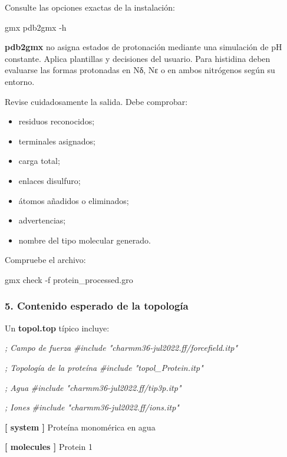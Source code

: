 \documentclass[
  spanish,
  11pt,
  a4paper]{article}
\newenvironment{Shaded}{\begin{snugshade}}{\end{snugshade}}
\newcommand{\AttributeTok}[1]{\textcolor[rgb]{0.13,0.29,0.53}{#1}}
\newcommand{\CommentTok}[1]{\textcolor[rgb]{0.56,0.35,0.01}{\textit{#1}}}
\newcommand{\DataTypeTok}[1]{\textcolor[rgb]{0.13,0.29,0.53}{#1}}
\newcommand{\ExtensionTok}[1]{#1}
\newcommand{\KeywordTok}[1]{\textcolor[rgb]{0.13,0.29,0.53}{\textbf{#1}}}
\newcommand{\NormalTok}[1]{#1}
\providecommand{\tightlist}{%
  \setlength{\itemsep}{0pt}\setlength{\parskip}{0pt}}
\begin{document}
Consulte las opciones exactas de la instalación:

\begin{Shaded}
\begin{Highlighting}[]
\ExtensionTok{gmx}\NormalTok{ pdb2gmx }\AttributeTok{{-}h}
\end{Highlighting}
\end{Shaded}

\textbf{pdb2gmx} no asigna estados de protonación mediante una
simulación de pH constante. Aplica plantillas y decisiones del usuario.
Para histidina deben evaluarse las formas protonadas en Nδ, Nε o en
ambos nitrógenos según su entorno.

Revise cuidadosamente la salida. Debe comprobar:

\begin{itemize}
\tightlist
\item
  residuos reconocidos;
\item
  terminales asignados;
\item
  carga total;
\item
  enlaces disulfuro;
\item
  átomos añadidos o eliminados;
\item
  advertencias;
\item
  nombre del tipo molecular generado.
\end{itemize}

Compruebe el archivo:

\begin{Shaded}
\begin{Highlighting}[]
\ExtensionTok{gmx}\NormalTok{ check }\AttributeTok{{-}f}\NormalTok{ protein\_processed.gro}
\end{Highlighting}
\end{Shaded}

\subsubsection{5. Contenido esperado de la
topología}\label{contenido-esperado-de-la-topologuxeda}

Un \textbf{topol.top} típico incluye:

\begin{Shaded}
\begin{Highlighting}[]
\CommentTok{; Campo de fuerza}
\CommentTok{\#include "charmm36{-}jul2022.ff/forcefield.itp"}

\CommentTok{; Topología de la proteína}
\CommentTok{\#include "topol\_Protein.itp"}

\CommentTok{; Agua}
\CommentTok{\#include "charmm36{-}jul2022.ff/tip3p.itp"}

\CommentTok{; Iones}
\CommentTok{\#include "charmm36{-}jul2022.ff/ions.itp"}

\KeywordTok{[ system ]}
\DataTypeTok{Proteína monomérica en agua}

\KeywordTok{[ molecules ]}
\DataTypeTok{Protein    1}
\end{Highlighting}
\end{Shaded}
\end{document}
